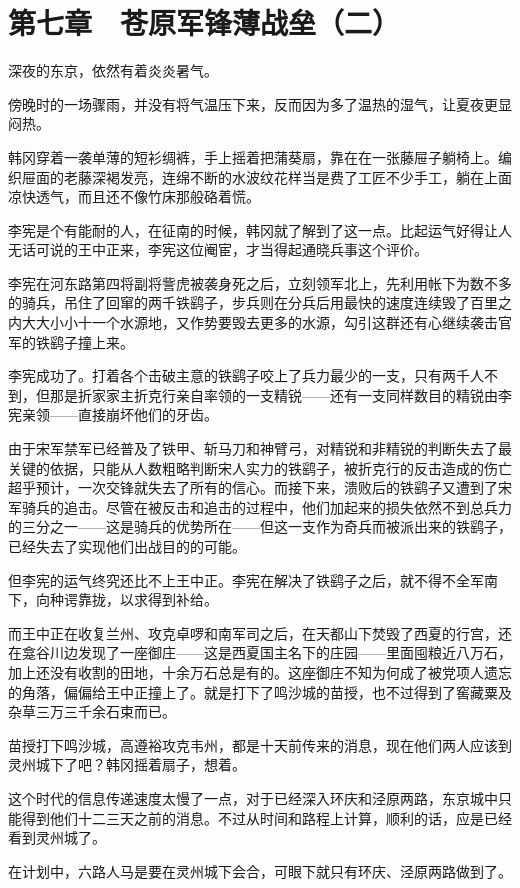 \section{第七章　苍原军锋薄战垒（二）}

深夜的东京，依然有着炎炎暑气。

傍晚时的一场骤雨，并没有将气温压下来，反而因为多了温热的湿气，让夏夜更显闷热。

韩冈穿着一袭单薄的短衫绸裤，手上摇着把蒲葵扇，靠在在一张藤屉子躺椅上。编织屉面的老藤深褐发亮，连绵不断的水波纹花样当是费了工匠不少手工，躺在上面凉快透气，而且还不像竹床那般硌着慌。

李宪是个有能耐的人，在征南的时候，韩冈就了解到了这一点。比起运气好得让人无话可说的王中正来，李宪这位阉宦，才当得起通晓兵事这个评价。

李宪在河东路第四将副将訾虎被袭身死之后，立刻领军北上，先利用帐下为数不多的骑兵，吊住了回窜的两千铁鹞子，步兵则在分兵后用最快的速度连续毁了百里之内大大小小十一个水源地，又作势要毁去更多的水源，勾引这群还有心继续袭击官军的铁鹞子撞上来。

李宪成功了。打着各个击破主意的铁鹞子咬上了兵力最少的一支，只有两千人不到，但那是折家家主折克行亲自率领的一支精锐——还有一支同样数目的精锐由李宪亲领——直接崩坏他们的牙齿。

由于宋军禁军已经普及了铁甲、斩马刀和神臂弓，对精锐和非精锐的判断失去了最关键的依据，只能从人数粗略判断宋人实力的铁鹞子，被折克行的反击造成的伤亡超乎预计，一次交锋就失去了所有的信心。而接下来，溃败后的铁鹞子又遭到了宋军骑兵的追击。尽管在被反击和追击的过程中，他们加起来的损失依然不到总兵力的三分之一——这是骑兵的优势所在——但这一支作为奇兵而被派出来的铁鹞子，已经失去了实现他们出战目的的可能。

但李宪的运气终究还比不上王中正。李宪在解决了铁鹞子之后，就不得不全军南下，向种谔靠拢，以求得到补给。

而王中正在收复兰州、攻克卓啰和南军司之后，在天都山下焚毁了西夏的行宫，还在龛谷川边发现了一座御庄——这是西夏国主名下的庄园——里面囤粮近八万石，加上还没有收割的田地，十余万石总是有的。这座御庄不知为何成了被党项人遗忘的角落，偏偏给王中正撞上了。就是打下了鸣沙城的苗授，也不过得到了窖藏粟及杂草三万三千余石束而已。

苗授打下鸣沙城，高遵裕攻克韦州，都是十天前传来的消息，现在他们两人应该到灵州城下了吧？韩冈摇着扇子，想着。

这个时代的信息传递速度太慢了一点，对于已经深入环庆和泾原两路，东京城中只能得到他们十二三天之前的消息。不过从时间和路程上计算，顺利的话，应是已经看到灵州城了。

在计划中，六路人马是要在灵州城下会合，可眼下就只有环庆、泾原两路做到了。

